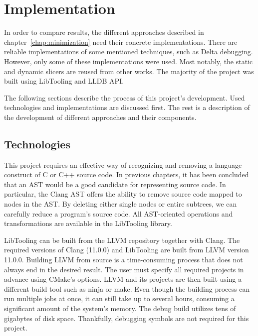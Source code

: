 \chapter{Implementation}


In order to compare results, the different approaches described in 
chapter~\ref{chap:minimization} need their concrete implementations.
There are reliable implementations of some mentioned techniques, such as 
Delta debugging.
However, only some of these implementations were used.
Most notably, the static and dynamic slicers are reused from other works.
The majority of the project was built using LibTooling and LLDB API.

The following sections describe the process of this project's development.
Used technologies and implementations are discussed first.
The rest is a description of the development of different approaches and 
their components.

\section{Technologies}

This project requires an effective way of recognizing and removing a language 
construct of C or C++ source code.
In previous chapters, it has been concluded that an AST would be a good 
candidate for representing source code.
In particular, the Clang AST offers the ability to remove source code mapped 
to nodes in the AST.
By deleting either single nodes or entire subtrees, we can carefully reduce 
a program's source code.
All AST-oriented operations and transformations are available in 
the LibTooling library.

LibTooling can be built from the LLVM repository together with Clang.
The required versions of Clang (11.0.0) and LibTooling are built from LLVM 
version 11.0.0.
Building LLVM from source is a time-consuming process that does not always 
end in the desired result.
The user must specify all required projects in advance using CMake's options.
LLVM and its projects are then built using a different build tool such as 
ninja or make.
Even though the building process can run multiple jobs at once, it can still 
take up to several hours, consuming a significant amount of the system's 
memory.
The debug build utilizes tens of gigabytes of disk space.
Thankfully, debugging symbols are not required for this project.

